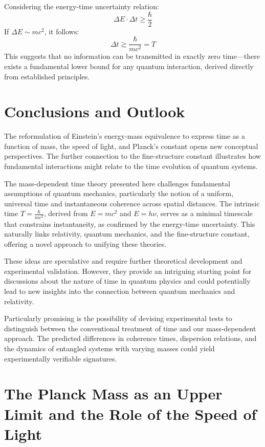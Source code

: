\documentclass{article}
\begin{document}
	Considering the energy-time uncertainty relation:
	\begin{equation}
		\Delta E \cdot \Delta t \geq \frac{\hbar}{2}
	\end{equation}
	If $\Delta E \sim mc^2$, it follows:
	\begin{equation}
		\Delta t \gtrsim \frac{\hbar}{mc^2} = T
	\end{equation}
	This suggests that no information can be transmitted in exactly zero time—there exists a fundamental lower bound for any quantum interaction, derived directly from established principles.
	
	\section{Conclusions and Outlook}
	
	The reformulation of Einstein’s energy-mass equivalence to express time as a function of mass, the speed of light, and Planck’s constant opens new conceptual perspectives. The further connection to the fine-structure constant illustrates how fundamental interactions might relate to the time evolution of quantum systems.
	
	The mass-dependent time theory presented here challenges fundamental assumptions of quantum mechanics, particularly the notion of a uniform, universal time and instantaneous coherence across spatial distances. The intrinsic time $T = \frac{\hbar}{mc^2}$, derived from $E = mc^2$ and $E = h\nu$, serves as a minimal timescale that constrains instantaneity, as confirmed by the energy-time uncertainty. This naturally links relativity, quantum mechanics, and the fine-structure constant, offering a novel approach to unifying these theories.
	
	These ideas are speculative and require further theoretical development and experimental validation. However, they provide an intriguing starting point for discussions about the nature of time in quantum physics and could potentially lead to new insights into the connection between quantum mechanics and relativity.
	
	Particularly promising is the possibility of devising experimental tests to distinguish between the conventional treatment of time and our mass-dependent approach. The predicted differences in coherence times, dispersion relations, and the dynamics of entangled systems with varying masses could yield experimentally verifiable signatures.
\section{The Planck Mass as an Upper Limit and the Role of the Speed of Light}
\end{document}
